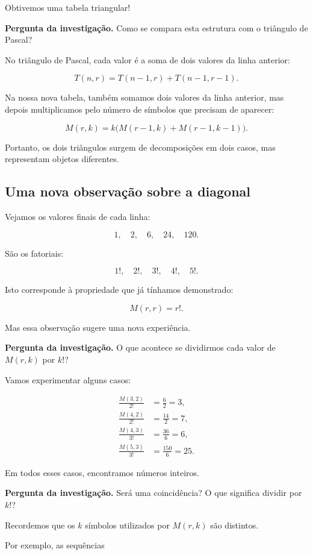 \documentclass[11pt,a4paper,oneside]{book}
\newcommand{\Pergunta}[1]{\begin{perguntabox}\textbf{Pergunta da investigação.} #1\end{perguntabox}}
\begin{document}
Obtivemos uma tabela triangular!

\Pergunta{Como se compara esta estrutura
com o triângulo de Pascal?}

No triângulo de Pascal, cada valor
é a soma de dois valores da linha anterior:

\[
T(n,r)=T(n-1,r)+T(n-1,r-1).
\]

Na nossa nova tabela, também somamos
dois valores da linha anterior,
mas depois multiplicamos pelo número
de símbolos que precisam de aparecer:

\[
M(r,k)=k\bigl(M(r-1,k)+M(r-1,k-1)\bigr).
\]

Portanto, os dois triângulos surgem
de decomposições em dois casos,
mas representam objetos diferentes.

\subsection*{Uma nova observação sobre a diagonal}

Vejamos os valores finais de cada linha:

\[
1,\quad2,\quad6,\quad24,\quad120.
\]

São os fatoriais:

\[
1!,\quad2!,\quad3!,\quad4!,\quad5!.
\]

Isto corresponde à propriedade
que já tínhamos demonstrado:

\[
M(r,r)=r!.
\]

Mas essa observação sugere
uma nova experiência.

\Pergunta{O que acontece se dividirmos
cada valor de $M(r,k)$ por $k!$?}

Vamos experimentar alguns casos:

\[
\begin{aligned}
\frac{M(3,2)}{2!}&=\frac{6}{2}=3,\\[2mm]
\frac{M(4,2)}{2!}&=\frac{14}{2}=7,\\[2mm]
\frac{M(4,3)}{3!}&=\frac{36}{6}=6,\\[2mm]
\frac{M(5,3)}{3!}&=\frac{150}{6}=25.
\end{aligned}
\]

Em todos esses casos, encontramos
números inteiros.

\Pergunta{Será uma coincidência?
O que significa dividir por $k!$?}

Recordemos que os $k$ símbolos
utilizados por $M(r,k)$ são distintos.

Por exemplo, as sequências
\end{document}
